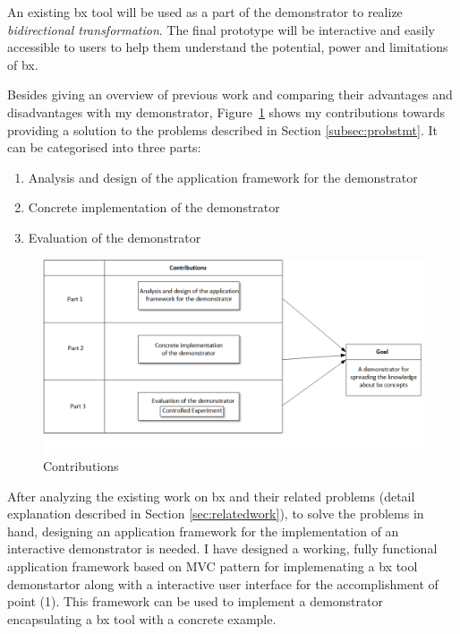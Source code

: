 An existing bx tool will be used as a part of the demonstrator to realize \textit{bidirectional transformation}. The final prototype will be interactive and easily accessible to users to help them understand the potential, power and limitations of bx.

Besides giving an overview of previous work and comparing their advantages and disadvantages with my demonstrator, Figure~\ref{fig:Contribution} shows my contributions towards providing a solution to the problems described in Section \ref{subsec:probstmt}. It can be categorised into three parts: 

\begin{enumerate} 
	\item {Analysis and design of the application framework for the demonstrator} 
	\item {Concrete implementation of the demonstrator}
	\item {Evaluation of the demonstrator}
\end{enumerate}

\begin{figure}
	\includegraphics[width=1\textwidth]{figures/Contribution}
	\caption{Contributions}
	\label{fig:Contribution}
\end{figure}

After analyzing the existing work on bx and their related problems (detail explanation described in Section \ref{sec:relatedwork}), to solve the problems in hand, designing an application framework for the implementation of an interactive demonstrator is needed. I have designed a working, fully functional application framework based on MVC pattern for implemenating a bx tool demonstartor along with a interactive user interface for the accomplishment of point (1). This framework can be used to implement a demonstrator encapsulating a bx tool with a concrete example.

